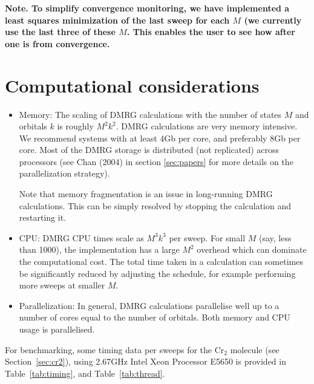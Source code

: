\documentclass[letterpaper,12pt,aps, pra]{revtex4-1}
\begin{document}
{\bf Note.  To simplify convergence monitoring, we have implemented a least
squares minimization of the last sweep for each $M$ (we currently use the last
three of these $M$. This enables the user to see how after one is from
convergence.}


\section{Computational considerations}\label{sec:computation}

\begin{itemize}
\item Memory: The scaling of DMRG calculations with the number of states $M$ and orbitals $k$ is roughly $M^2 k^2$.
DMRG calculations are very memory intensive. We recommend systems with at least 4Gb per core, and preferably 8Gb per core. Most
of the DMRG storage is distributed (not replicated) across processors (see Chan (2004) in section \ref{sec:papers} for more details
on the parallelization strategy).

Note that memory fragmentation is an issue in long-running DMRG calculations. This can be simply resolved by stopping the calculation and restarting it.
\item CPU: DMRG CPU times scale as $M^3 k^3$ per sweep. For small $M$ (say, less than 1000), the implementation has a
large $M^2$ overhead which can dominate the computational cost. The total time taken in a calculation can sometimes
be significantly reduced by adjusting the schedule, for example performing more sweeps at smaller $M$.
\item Parallelization: In general, DMRG calculations parallelise well up to a number of cores equal to the number of orbitals. Both
memory and CPU usage is parallelised.
\end{itemize}

For benchmarking, some timing data per sweeps for the Cr$_2$ molecule (see
Section~\ref{sec:cr2}), using 2.67GHz Intel Xeon Processor E5650 is provided in
Table~\ref{tab:timing}, and Table~\ref{tab:thread}.
\end{document}
